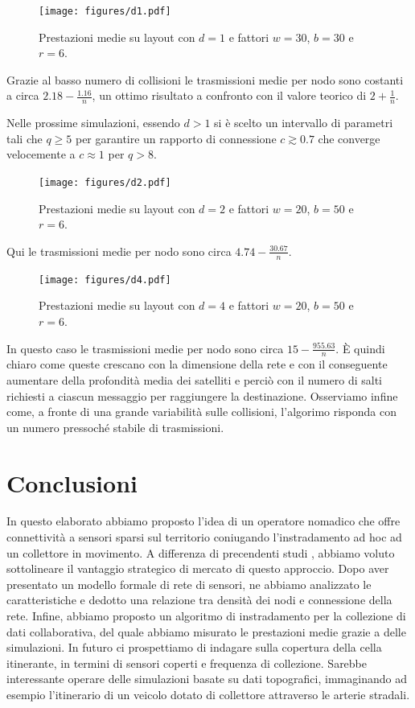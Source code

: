 \documentclass[a4paper,11pt]{article}
\theoremstyle{definition}
\begin{document}
\begin{figure}[H]
\centering
\texttt{[image: figures/d1.pdf]}
\caption{Prestazioni medie su layout con $d=1$ e fattori $w=30$, $b=30$ e $r=6$.}
\end{figure}

Grazie al basso numero di collisioni le trasmissioni medie per nodo sono costanti a circa $2.18 - \frac{1.16}{n}$, un ottimo risultato a confronto con il valore teorico di $2 + \frac{1}{n}$.

Nelle prossime simulazioni, essendo $d>1$ si è scelto un intervallo di parametri tali che $q \geq 5$ per garantire un rapporto di connessione $c \gtrsim 0.7$ che converge velocemente a $c \approx 1$ per $q > 8$.

\begin{figure}[H]
\centering
\texttt{[image: figures/d2.pdf]}
\caption{Prestazioni medie su layout con $d=2$ e fattori $w=20$, $b=50$ e $r=6$.}
\end{figure}

Qui le trasmissioni medie per nodo sono circa $4.74 - \frac{30.67}{n}$.

\begin{figure}[H]
\centering
\texttt{[image: figures/d4.pdf]}
\caption{Prestazioni medie su layout con $d=4$ e fattori $w=20$, $b=50$ e $r=6$.}
\end{figure}

In questo caso le trasmissioni medie per nodo sono circa $15 - \frac{955.63}{n}$. È quindi chiaro come queste crescano con la dimensione della rete e con il conseguente aumentare della profondità media dei satelliti e perciò con il numero di salti richiesti a ciascun messaggio per raggiungere la destinazione. Osserviamo infine come, a fronte di una grande variabilità sulle collisioni, l'algorimo risponda con un numero pressoché stabile di trasmissioni.

\section{Conclusioni}

In questo elaborato abbiamo proposto l'idea di un operatore nomadico che offre connettività a sensori sparsi sul territorio coniugando l'instradamento ad hoc ad un collettore in movimento. A differenza di precendenti studi \cite{moblife1, moblife2}, abbiamo voluto sottolineare il vantaggio strategico di mercato di questo approccio. Dopo aver presentato un modello formale di rete di sensori, ne abbiamo analizzato le caratteristiche e dedotto una relazione tra densità dei nodi e connessione della rete. Infine, abbiamo proposto un algoritmo di instradamento per la collezione di dati collaborativa, del quale abbiamo misurato le prestazioni medie grazie a delle simulazioni. In futuro ci prospettiamo di indagare sulla copertura della cella itinerante, in termini di sensori coperti e frequenza di collezione. Sarebbe interessante operare delle simulazioni basate su dati topografici, immaginando ad esempio l'itinerario di un veicolo dotato di collettore attraverso le arterie stradali.
\end{document}
